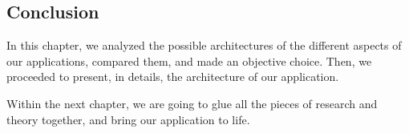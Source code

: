 \begin{toexclude}
\section{Conclusion}

In this chapter, we analyzed the possible architectures of the different aspects of our applications, compared them, and made an objective choice.
Then, we proceeded to present, in details, the architecture of our application.

Within the next chapter, we are going to glue all the pieces of research and theory together, and bring our application to life.

\end{toexclude}
